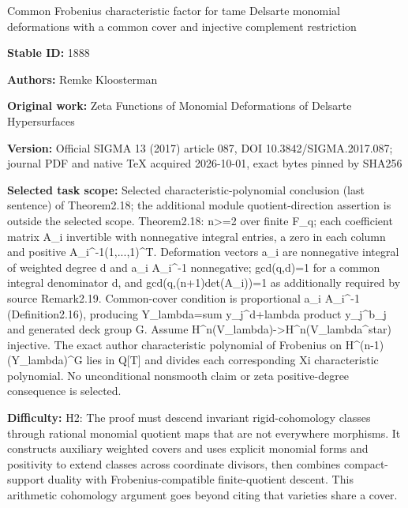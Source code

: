 \documentclass[11pt]{article}
\numberwithin{equation}{section}
\begin{document}
\begin{center}\Large Common Frobenius characteristic factor for tame Delsarte monomial deformations with a common cover and injective complement restriction\end{center}
\noindent\textbf{Stable ID:} 1888\par
\noindent\textbf{Authors:} Remke Kloosterman\par
\noindent\textbf{Original work:} Zeta Functions of Monomial Deformations of Delsarte Hypersurfaces\par
\noindent\textbf{Version:} Official SIGMA 13 (2017) article 087, DOI 10.3842/SIGMA.2017.087; journal PDF and native TeX acquired 2026-10-01, exact bytes pinned by SHA256\par
\noindent\textbf{Selected task scope:} Selected characteristic-polynomial conclusion (last sentence) of Theorem2.18; the additional module quotient-direction assertion is outside the selected scope. Theorem2.18: n>=\allowbreak{}2 over finite F\_q; each coefficient matrix A\_i invertible with nonnegative integral entries, a zero in each column and positive A\_i\textasciicircum{}-1(1,...,1)\textasciicircum{}T. Deformation vectors a\_i are nonnegative integral of weighted degree d and a\_i A\_i\textasciicircum{}-1 nonnegative; gcd(q,d)=\allowbreak{}1 for a common integral denominator d, and gcd(q,(n+\allowbreak{}1)det(A\_i))=\allowbreak{}1 as additionally required by source Remark2.19. Common-cover condition is proportional a\_i A\_i\textasciicircum{}-1 (Definition2.16), producing Y\_lambda=\allowbreak{}sum y\_j\textasciicircum{}d+\allowbreak{}lambda product y\_j\textasciicircum{}b\_j and generated deck group G. Assume H\textasciicircum{}n(V\_lambda)->H\textasciicircum{}n(V\_lambda\textasciicircum{}star) injective. The exact author characteristic polynomial of Frobenius on H\textasciicircum{}(n-1)(Y\_lambda)\textasciicircum{}G lies in Q[T] and divides each corresponding Xi characteristic polynomial. No unconditional nonsmooth claim or zeta positive-degree consequence is selected.\par
\noindent\textbf{Difficulty:} H2: The proof must descend invariant rigid-cohomology classes through rational monomial quotient maps that are not everywhere morphisms. It constructs auxiliary weighted covers and uses explicit monomial forms and positivity to extend classes across coordinate divisors, then combines compact-support duality with Frobenius-compatible finite-quotient descent. This arithmetic cohomology argument goes beyond citing that varieties share a cover.\par
\end{document}
